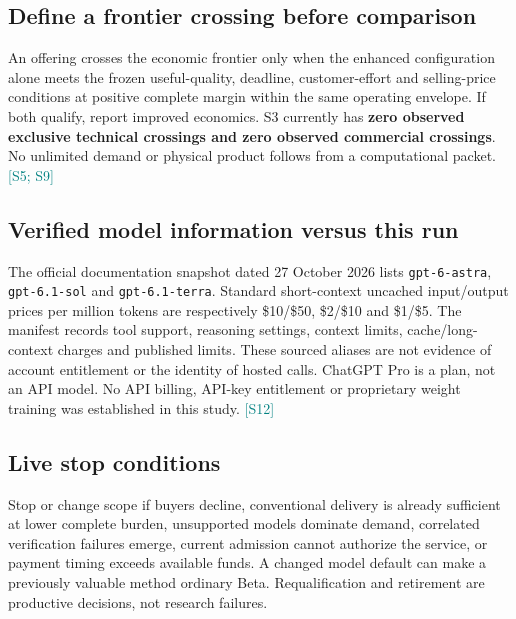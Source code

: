\documentclass[10pt,letterpaper]{article}
\newcommand{\src}[1]{\textcolor{Teal}{\scriptsize[#1]}}
\begin{document}
\subsection*{Define a frontier crossing before comparison}
An offering crosses the economic frontier only when the enhanced configuration alone meets the frozen useful-quality, deadline, customer-effort and selling-price conditions at positive complete margin within the same operating envelope. If both qualify, report improved economics. S3 currently has \textbf{zero observed exclusive technical crossings and zero observed commercial crossings}. No unlimited demand or physical product follows from a computational packet. \src{S5; S9}

\subsection*{Verified model information versus this run}
The official documentation snapshot dated 27 October 2026 lists \texttt{gpt-6-astra}, \texttt{gpt-6.1-sol} and \texttt{gpt-6.1-terra}. Standard short-context uncached input/output prices per million tokens are respectively \$10/\$50, \$2/\$10 and \$1/\$5. The manifest records tool support, reasoning settings, context limits, cache/long-context charges and published limits. These sourced aliases are not evidence of account entitlement or the identity of hosted calls. ChatGPT Pro is a plan, not an API model. No API billing, API-key entitlement or proprietary weight training was established in this study. \src{S12}

\subsection*{Live stop conditions}
Stop or change scope if buyers decline, conventional delivery is already sufficient at lower complete burden, unsupported models dominate demand, correlated verification failures emerge, current admission cannot authorize the service, or payment timing exceeds available funds. A changed model default can make a previously valuable method ordinary Beta. Requalification and retirement are productive decisions, not research failures.
\end{document}
